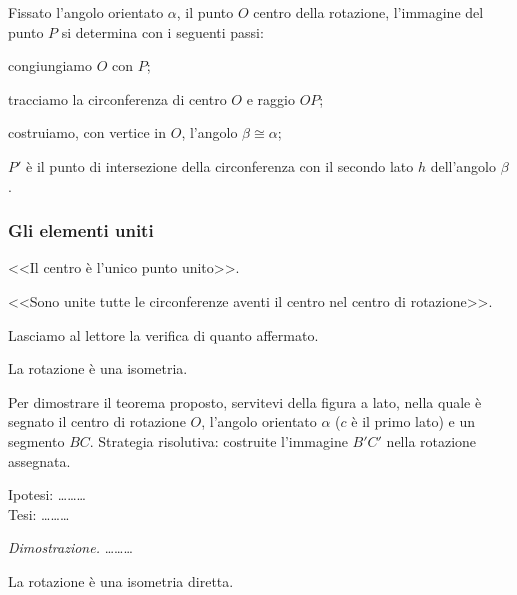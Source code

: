 Fissato l'angolo orientato $\alpha$, il punto $O$ centro della rotazione, l'immagine del punto $P$ si determina con i seguenti passi:
\begin{enumerate*}
\item congiungiamo $O$ con $P$;
\item tracciamo la circonferenza di centro $O$ e raggio $OP$;
\item costruiamo, con vertice in $O$, l'angolo $\beta\cong \alpha$;
\item $P'$ è il punto di intersezione della circonferenza con il secondo lato $h$ dell'angolo $\beta$.
\end{enumerate*}
		
\begin{comment}		
68   Prendete in considerazione l’angolo  di vertice T, sia O il centro di rotazione e F un punto del piano di cui si vuole determinare l’immagine. Costruite F’ seguendo i passi illustrati sopra.
\end{comment}
		
\subsubsection{Gli elementi uniti}
\begin{itemize*}
\item <<Il centro è l'unico punto unito>>.
\item <<Sono unite tutte le circonferenze aventi il centro nel centro di rotazione>>.
\end{itemize*}
		
Lasciamo al lettore la verifica di quanto affermato.
		
\begin{teorema}
La rotazione è una isometria.
\end{teorema}
		
Per dimostrare il teorema proposto, servitevi della figura a lato, nella quale è segnato il centro di rotazione $O$, l'angolo orientato $\alpha$ ($c$ è il primo lato) e un segmento $BC$.
Strategia risolutiva: costruite l'immagine $B'C'$ nella rotazione assegnata.
		
\noindent Ipotesi: \ldots\ldots\ldots{}\\
Tesi: \ldots\ldots\ldots{}
		
\emph{Dimostrazione.} \ldots\ldots\ldots{}
		
\begin{teorema}
La rotazione è una isometria diretta.
\end{teorema}
		

